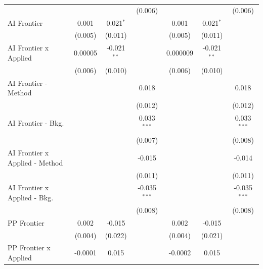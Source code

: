 \begin{tabular}{lcccccc}
                                  &                &                & (0.006)        &                &                & (0.006)\\   
   AI Frontier                    & 0.001          & 0.021$^{*}$    &                & 0.001          & 0.021$^{*}$    &   \\   
                                  & (0.005)        & (0.011)        &                & (0.005)        & (0.011)        &   \\   
   AI Frontier x Applied          & 0.00005        & -0.021$^{**}$  &                & 0.000009       & -0.021$^{**}$  &   \\   
                                  & (0.006)        & (0.010)        &                & (0.006)        & (0.010)        &   \\   
   AI Frontier - Method           &                &                & 0.018          &                &                & 0.018\\   
                                  &                &                & (0.012)        &                &                & (0.012)\\   
   AI Frontier - Bkg.             &                &                & 0.033$^{***}$  &                &                & 0.033$^{***}$\\   
                                  &                &                & (0.007)        &                &                & (0.008)\\   
   AI Frontier x Applied - Method &                &                & -0.015         &                &                & -0.014\\   
                                  &                &                & (0.011)        &                &                & (0.011)\\   
   AI Frontier x Applied - Bkg.   &                &                & -0.035$^{***}$ &                &                & -0.035$^{***}$\\   
                                  &                &                & (0.008)        &                &                & (0.008)\\   
   PP Frontier                    & 0.002          & -0.015         &                & 0.002          & -0.015         &   \\   
                                  & (0.004)        & (0.022)        &                & (0.004)        & (0.021)        &   \\   
   PP Frontier x Applied          & -0.0001        & 0.015          &                & -0.0002        & 0.015          &   \\   

\end{tabular}
